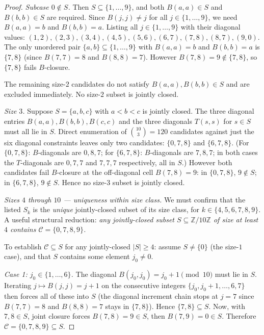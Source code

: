 \documentclass[11pt,reqno]{amsart}
\theoremstyle{plain}
\theoremstyle{definition}
\theoremstyle{remark}
\newcommand{\Z}{\mathbb{Z}}
\newcommand{\Zten}{\Z/10\Z}
\newcommand{\Cfour}{\mathcal{C}}
\begin{document}
\begin{proof}
\emph{Subcase $0\notin S$.} Then $S\subseteq\{1,\dots,9\}$, and
both $B(a,a)\in S$ and $B(b,b)\in S$ are required. Since
$B(j,j)\neq j$ for all $j\in\{1,\dots,9\}$, we need $B(a,a)=b$ and
$B(b,b)=a$. Listing all $j\in\{1,\dots,9\}$ with their diagonal
values: $(1,2),(2,3),(3,4),(4,5),(5,6),(6,7),(7,8),(8,7),(9,0)$.
The only unordered pair $\{a,b\}\subseteq\{1,\dots,9\}$ with
$B(a,a)=b$ and $B(b,b)=a$ is $\{7,8\}$ (since $B(7,7)=8$ and
$B(8,8)=7$). However $B(7,8)=9\notin\{7,8\}$, so $\{7,8\}$ fails
$B$-closure.

The remaining size-$2$ candidates do not satisfy
$B(a,a),B(b,b)\in S$ and are excluded immediately. No size-$2$
subset is jointly closed.

\emph{Size $3$.} Suppose $S=\{a,b,c\}$ with $a<b<c$ is jointly
closed. The three diagonal entries $B(a,a),B(b,b),B(c,c)$ and the
three diagonals $T(s,s)$ for $s\in S$ must all lie in $S$. Direct
enumeration of $\binom{10}{3}=120$ candidates against just the
six diagonal constraints leaves only two candidates:
$\{0,7,8\}$ and $\{6,7,8\}$. (For $\{0,7,8\}$: $B$-diagonals are
$0,8,7$; for $\{6,7,8\}$: $B$-diagonals are $7,8,7$; in both
cases the $T$-diagonals are $0,7,7$ and $7,7,7$ respectively,
all in $S$.) However both candidates fail $B$-closure at the
off-diagonal cell $B(7,8)=9$: in $\{0,7,8\}$, $9\notin S$; in
$\{6,7,8\}$, $9\notin S$. Hence no size-$3$ subset is jointly
closed.

\emph{Sizes $4$ through $10$ --- uniqueness within size class.}
We must confirm that the listed $S_{k}$ is the \emph{unique}
jointly-closed subset of its size class, for $k\in\{4,5,6,7,8,9\}$.
A useful structural reduction: \emph{any jointly-closed subset
$S \subseteq \Zten$ of size at least $4$ contains
$\Cfour = \{0, 7, 8, 9\}$.}

To establish $\Cfour \subseteq S$ for any jointly-closed
$|S| \geq 4$: assume $S \neq \{0\}$ (the size-$1$ case),
and that $S$ contains some element $j_{0} \neq 0$.

\emph{Case 1: $j_{0} \in \{1,\dots,6\}$.} The diagonal
$B(j_{0},j_{0}) = j_{0} + 1 \pmod{10}$ must lie in $S$. Iterating
$j \mapsto B(j,j) = j + 1$ on the consecutive integers
$\{j_{0}, j_{0}+1, \dots, 6, 7\}$ then forces all of these into
$S$ (the diagonal increment chain stops at $j = 7$ since
$B(7,7) = 8$ and $B(8,8) = 7$ stays in $\{7, 8\}$). Hence
$\{7, 8\} \subseteq S$. Now, with $7, 8 \in S$, joint closure
forces $B(7, 8) = 9 \in S$, then $B(7, 9) = 0 \in S$. Therefore
$\Cfour = \{0, 7, 8, 9\} \subseteq S$.


\end{proof}
\end{document}
